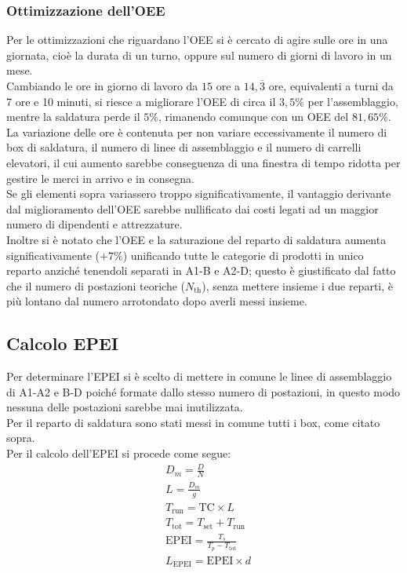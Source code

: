 \documentclass[11pt]{article}
\begin{document}
\subsubsection{Ottimizzazione dell'OEE}
Per le ottimizzazioni che riguardano l'OEE si è cercato di agire sulle ore in una giornata, cioè la durata di un turno, oppure sul numero di giorni di lavoro in un mese.\\
Cambiando le ore in giorno di lavoro da \(15\) ore a \(14,\bar{3}\) ore, equivalenti a turni da 7 ore e 10 minuti, si riesce a migliorare l'OEE di circa il \(3,5\%\) per l'assemblaggio, mentre la saldatura perde il \(5\%\), rimanendo comunque con un OEE del \(81,65\%\).\\
La variazione delle ore è contenuta per non variare eccessivamente il numero di box di saldatura, il numero di linee di assemblaggio e il numero di carrelli elevatori, il cui aumento sarebbe conseguenza di una finestra di tempo ridotta per gestire le merci in arrivo e in consegna.\\
Se gli elementi sopra variassero troppo significativamente, il vantaggio derivante dal miglioramento dell'OEE sarebbe nullificato dai costi legati ad un maggior numero di dipendenti e attrezzature.\\
Inoltre si è notato che l'OEE e la saturazione del reparto di saldatura aumenta significativamente (\(+7\%\)) unificando tutte le categorie di prodotti in unico reparto anziché tenendoli separati in A1-B e A2-D; questo è giustificato dal fatto che il numero di postazioni teoriche (\(N_{\text{th}}\)), senza mettere insieme i due reparti, è più lontano dal numero arrotondato dopo averli messi insieme.
\newpage

\subsection{Calcolo EPEI}
Per determinare l'EPEI si è scelto di mettere in comune le linee di assemblaggio di A1-A2 e B-D poiché formate dallo stesso numero di postazioni, in questo modo nessuna delle postazioni sarebbe mai inutilizzata.\\
Per il reparto di saldatura sono stati messi in comune tutti i box, come citato sopra.\\

\noindent
Per il calcolo dell'EPEI si procede come segue:
\begin{align}
    & D_m = \frac{D}{N} \\
    & L = \frac{D_m}{g} \\
    & T_\text{run} = \text{TC} \times L \\
    & T_\text{tot} = T_\text{set} + T_\text{run} \\
    & \text{EPEI} = \frac{T_s}{T_p - T_\text{tot}} \\
    & L_\text{EPEI} = \text{EPEI} \times d
\end{align}
\end{document}
